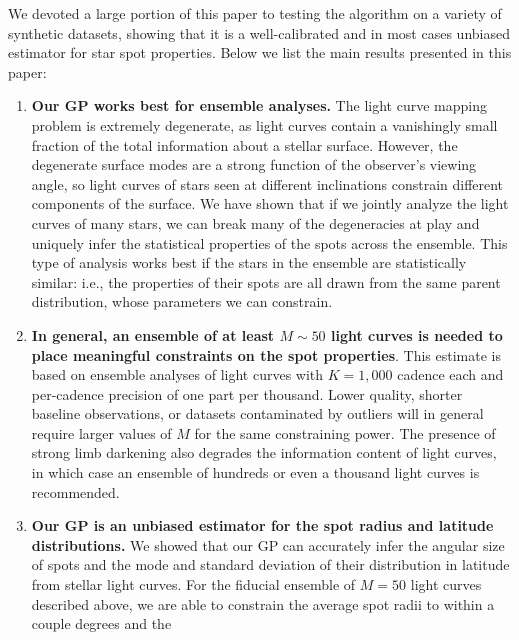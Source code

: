 \documentclass[modern]{aastex62}
\begin{document}
We devoted a large portion of this paper to testing the algorithm on a variety
of synthetic datasets, showing that it is a well-calibrated and in most
cases unbiased estimator for star spot properties. Below we list the main
results presented in this paper:

\begin{enumerate}
    \item \textbf{Our GP works best for ensemble analyses.} The light curve mapping
          problem is extremely degenerate, as light curves contain a vanishingly small
          fraction of the total information about a stellar surface. However, the
          degenerate surface modes are a strong function of the observer's viewing
          angle, so light curves of stars seen at different inclinations constrain
          different components of the surface. We have shown that if we jointly
          analyze the light curves of many stars,
          we can break many of the degeneracies at play and uniquely infer the
          statistical properties of the spots across the ensemble. This type
          of analysis works best if the stars in the ensemble are statistically
          similar: i.e., the properties of their spots are all drawn from the
          same parent distribution, whose parameters we can constrain.
    \item \textbf{In general, an ensemble of at least $M \sim 50$ light curves
              is needed to place meaningful constraints on the spot properties}.
          This estimate is based on ensemble analyses of light curves with
          $K = 1{,}000$ cadence each and per-cadence precision of one part
          per thousand. Lower quality, shorter baseline observations, or
          datasets contaminated by outliers will in general require larger values
          of $M$ for the same constraining power. The presence of strong limb
          darkening also degrades the information content of light curves, in
          which case an ensemble of hundreds or even a thousand light curves
          is recommended.
    \item \textbf{Our GP is an unbiased estimator for the spot radius and
              latitude distributions.} We showed that our GP can accurately infer the
          angular size of spots and the mode and standard deviation of their
          distribution in latitude from stellar light curves. For the fiducial
          ensemble of $M = 50$ light curves described above, we are able to
          constrain the average spot radii to within a couple degrees and the

\end{enumerate}
\end{document}
